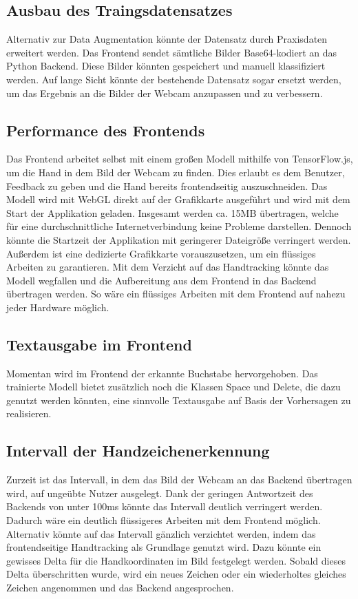 \documentclass[11pt,bibliography=totocnumbered]{scrartcl}
\begin{document}
\subsection{Ausbau des Traingsdatensatzes}
Alternativ zur Data Augmentation könnte der Datensatz durch Praxisdaten erweitert werden. Das Frontend sendet sämtliche Bilder Base64-kodiert an das Python Backend. Diese Bilder könnten gespeichert und manuell klassifiziert werden. Auf lange Sicht könnte der bestehende Datensatz sogar ersetzt werden, um das Ergebnis an die Bilder der Webcam anzupassen und zu verbessern.
\subsection{Performance des Frontends}
Das Frontend arbeitet selbst mit einem großen Modell mithilfe von TensorFlow.js, um die Hand in dem Bild der Webcam zu finden. Dies erlaubt es dem Benutzer, Feedback zu geben und die Hand bereits frontendseitig auszuschneiden. Das Modell wird mit WebGL direkt auf der Grafikkarte ausgeführt und wird mit dem Start der Applikation geladen. Insgesamt werden ca. 15MB übertragen, welche für eine durchschnittliche Internetverbindung keine Probleme darstellen. Dennoch könnte die Startzeit der Applikation mit geringerer Dateigröße verringert werden. Außerdem ist eine dedizierte Grafikkarte vorauszusetzen, um ein flüssiges Arbeiten zu garantieren. Mit dem Verzicht auf das Handtracking könnte das Modell wegfallen und die Aufbereitung aus dem Frontend in das Backend übertragen werden. So wäre ein flüssiges Arbeiten mit dem Frontend auf nahezu jeder Hardware möglich.
\subsection{Textausgabe im Frontend}
Momentan wird im Frontend der erkannte Buchstabe hervorgehoben. Das trainierte Modell bietet zusätzlich noch die Klassen Space und Delete, die dazu genutzt werden könnten, eine sinnvolle Textausgabe auf Basis der Vorhersagen zu realisieren. 
\subsection{Intervall der Handzeichenerkennung}
Zurzeit ist das Intervall, in dem das Bild der Webcam an das Backend übertragen wird, auf ungeübte Nutzer ausgelegt. Dank der geringen Antwortzeit des Backends von unter 100ms könnte das Intervall deutlich verringert werden. Dadurch wäre ein deutlich flüssigeres Arbeiten mit dem Frontend möglich. Alternativ könnte auf das Intervall gänzlich verzichtet werden, indem das frontendseitige Handtracking als Grundlage genutzt wird. Dazu könnte ein gewisses Delta für die Handkoordinaten im Bild festgelegt werden. Sobald dieses Delta überschritten wurde, wird ein neues Zeichen oder ein wiederholtes gleiches Zeichen angenommen und das Backend angesprochen. 
\setcounter{biburllcpenalty}{7000}
\setcounter{biburlucpenalty}{8000}
\pagebreak
\printbibliography[title=Quellen]
\end{document}
